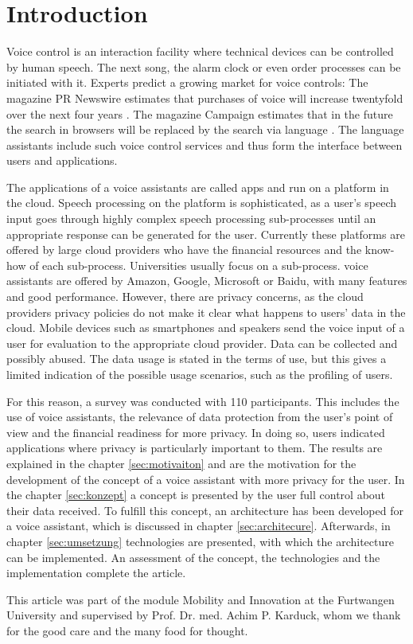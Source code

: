 \section{Introduction}
Voice control is an interaction facility where technical devices can be controlled by human speech. The next song, the alarm clock or even order processes can be initiated with it. Experts predict a growing market for voice controls: The magazine \glqq PR Newswire\grqq{} estimates that purchases of voice will increase twentyfold over the next four years \cite{prNewswire}. The magazine \glqq Campaign\grqq{} estimates that in the future the search in browsers will be replaced by the search via language \cite{Campaign}. The language assistants include such voice control services and thus form the interface between users and applications.

The applications of a voice assistants are called apps and run on a platform in the cloud. Speech processing on the platform is sophisticated, as a user's speech input goes through highly complex speech processing sub-processes until an appropriate response can be generated for the user. Currently these platforms are offered by large cloud providers who have the financial resources and the know-how of each sub-process. Universities usually focus on a sub-process. voice assistants are offered by Amazon, Google, Microsoft or Baidu, with many features and good performance. However, there are privacy concerns, as the cloud providers privacy policies do not make it clear what happens to users' data in the cloud. Mobile devices such as smartphones and speakers send the voice input of a user for evaluation to the appropriate cloud provider. Data can be collected and possibly abused. The data usage is stated in the terms of use, but this gives a limited indication of the possible usage scenarios, such as the profiling of users.

For this reason, a survey was conducted with 110 participants. This includes the use of voice assistants, the relevance of data protection from the user's point of view and the financial readiness for more privacy. In doing so, users indicated applications where privacy is particularly important to them. The results are explained in the chapter \ref{sec:motivaiton} and are the motivation for the development of the concept of a voice assistant with more privacy for the user. In the chapter \ref{sec:konzept} a concept is presented by the user full control about their data received. To fulfill this concept, an architecture has been developed for a voice assistant, which is discussed in chapter \ref{sec:architecure}. Afterwards, in chapter \ref{sec:umsetzung} technologies are presented, with which the architecture can be implemented. An assessment of the concept, the technologies and the implementation complete the article. \newline

This article was part of the module \glqq Mobility and Innovation\grqq{} at the Furtwangen University  and supervised by Prof. Dr. med. Achim P. Karduck, whom we thank for the good care and the many food for thought.
